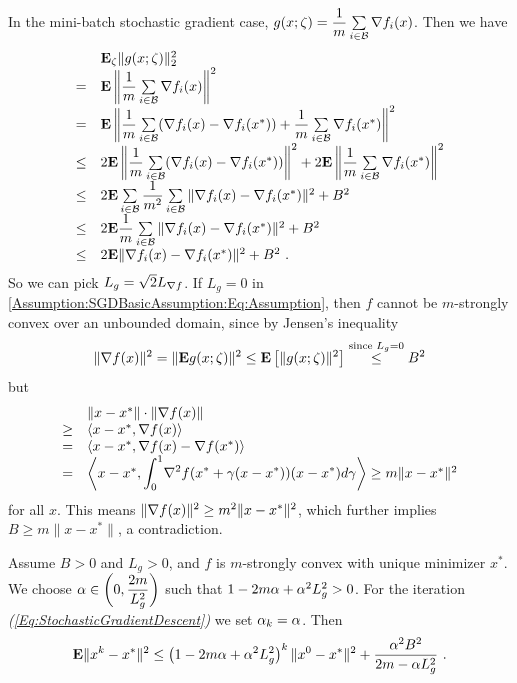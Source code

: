 \begin{remark}\label{Remark:SGD-Assumption}
In the mini-batch stochastic gradient case, $g(x;\zeta)=\dfrac{1}{m}\sum\limits_{i\in \mathcal B}\nabla f_i(x)$. Then we have
$$\begin{array}{ll}
&\mathbf E_\zeta\|g(x;\zeta)\|_2^2
\\
= & \mathbf E\left\|\dfrac{1}{m}\sum\limits_{i\in \mathcal B}\nabla f_i(x)\right\|^2
\\
= & \mathbf E\left\|\dfrac{1}{m}\sum\limits_{i\in \mathcal B}(\nabla f_i(x)-\nabla f_i(x^*))+\dfrac{1}{m}\sum\limits_{i\in \mathcal B}\nabla f_i(x^*)\right\|^2
\\
\leq & 2\mathbf E\left\|\dfrac{1}{m}\sum\limits_{i\in \mathcal B}(\nabla f_i(x)-\nabla f_i(x^*))\right\|^2+2\mathbf E\left\|\dfrac{1}{m}\sum\limits_{i\in \mathcal B}\nabla f_i(x^*)\right\|^2
\\
\leq & 2\mathbf E\sum\limits_{i\in \mathcal B}\dfrac{1}{m^2}\sum\limits_{i\in \mathcal B}\|\nabla f_i(x)-\nabla f_i(x^*)\|^2+B^2
\\
\leq & 2\mathbf E\dfrac{1}{m}\sum\limits_{i\in \mathcal B}\|\nabla f_i(x)-\nabla f_i(x^*)\|^2+B^2
\\
\leq & 2\mathbf E\|\nabla f_i(x)-\nabla f_i(x^*)\|^2+B^2 \ .
\end{array}$$
So we can pick $L_g=\sqrt{2}L_{\nabla f}$. If $L_g=0$ in \eqref{Assumption:SGDBasicAssumption:Eq:Assumption}, then $f$ cannot be $m$-strongly convex over an unbounded domain, since by Jensen's inequality 
$$\|\nabla f(x)\|^2=\|\mathbf E g(x; \zeta)\|^2\leq \mathbf E\left[\|g(x;\zeta)\|^2\right]\stackrel{\text{since } L_g=0}{\leq} B^2$$ but 
$$\begin{array}{ll}
& \|x-x^*\|\cdot \|\nabla f(x)\|
\\
\geq & \langle x-x^*, \nabla f(x)\rangle
\\
= & \langle x-x^*, \nabla f(x)-\nabla f(x^*)\rangle
\\
= & \left\langle x-x^*, \displaystyle{\int_0^1} \nabla^2 f(x^*+\gamma(x-x^*))(x-x^*)d\gamma\right\rangle \geq m\|x-x^*\|^2
\end{array}$$ for all $x$. This means $\|\nabla f(x)\|^2\geq m^2\|x-x^*\|^2$, which further implies $B\geq m\|x-x^*\|$, a contradiction.
\end{remark}


\begin{theorem}\label{Thm:ConvergenceSGD} Assume $B>0$ and $L_g>0$, and $f$ is $m$-strongly convex with unique minimizer $x^*$. We choose $\alpha\in \left(0, \dfrac{2m}{L_g^2}\right)$ such that $1-2m\alpha+\alpha^2L_g^2>0$. For the iteration \emph{(\ref{Eq:StochasticGradientDescent})} we set $\alpha_k=\alpha$. Then
\begin{equation}\label{Thm:ConvergenceSGD:Eq:ConvergenceStronglyConvex}
\mathbf E\|x^k-x^*\|^2\leq \left(1-2m\alpha+\alpha^2L_g^2\right)^k\|x^0-x^*\|^2+\dfrac{\alpha^2 B^2}{2m-\alpha L_g^2} \ .
\end{equation}
\end{theorem}

